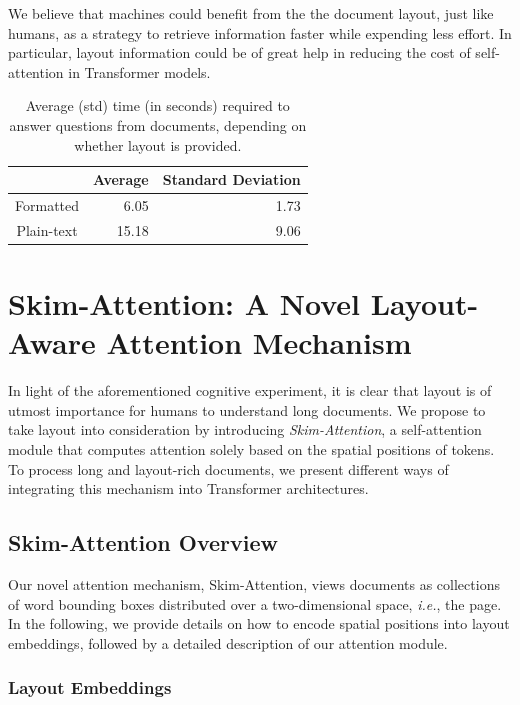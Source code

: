 We believe that machines could benefit from the the document layout, just like humans, as a strategy to retrieve information faster while expending less effort. In particular, layout information could be of great help in reducing the cost of self-attention in Transformer models.

\begin{table}
\centering \small
    \begin{tabular}{crr}
        \hline
                   & \textbf{Average} & \textbf{Standard Deviation} \\
        \hline 
        Formatted  & 6.05  & 1.73 \\
        Plain-text & 15.18 & 9.06 \\
        \hline
    \end{tabular}
\caption{Average (std) time (in seconds) required to answer questions from documents, depending on whether layout is provided.}
\label{tab:chapter3-human-eval}
\end{table}

\section{Skim-Attention: A Novel Layout-Aware Attention Mechanism}

In light of the aforementioned cognitive experiment, it is clear that layout is of utmost importance for humans to understand long documents. We propose to take layout into consideration by introducing \emph{Skim-Attention}, a self-attention module that computes attention solely based on the spatial positions of tokens. To process long and layout-rich documents, we present different ways of integrating this mechanism into Transformer architectures.

\subsection{Skim-Attention Overview}

Our novel attention mechanism, Skim-Attention, views documents as collections of word bounding boxes distributed over a two-dimensional space, \textit{i.e.}, the page. In the following, we provide details on how to encode spatial positions into layout embeddings, followed by a detailed description of our attention module.

\subsubsection{Layout Embeddings}

